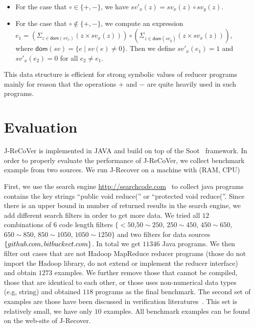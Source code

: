 \documentclass{llncs}
\newcommand{\dom}[1]{\mathsf{dom}(#1)}
\begin{document}
\begin{itemize}
	\item For the case that $\circ \in\{+,-\}$, we have $sv'_x(z) = sv_x(z)\circ  sv_y(z)$. 
	\item For the case that $\circ \notin\{+,-\}$, we compute an expression $e_1= (\Sigma_{z\in \dom{sv_x}} (z\times sv_x(z)) )\circ (\Sigma_{z\in \dom{sv_y}} (z\times sv_x(z)))$, where $\dom{sv}=\{e\mid sv(e)\neq 0\}$. Then we define $sv'_x(e_1) =1$ and $sv'_x(e_2) = 0$ for all $e_2\neq e_1$. 
\end{itemize}

This data structure is efficient for strong symbolic values of reducer programs mainly for reason that the operations $+$ and $-$ are quite heavily used in such programs. 



\section{Evaluation}
\label{section:exp}
J-ReCoVer is implemented in JAVA and build on top of the Soot~\cite{soot} framework. In order to properly evaluate the performance of J-ReCoVer, we collect benchmark example from two sources. We run J-Recover on a machine with (RAM, CPU)

First, we use the search engine \url{http://searchcode.com}~\cite{searchcode} to collect java programs contains the key strings ``public void reduce('' or ``protected void reduce(''.  Since there is an upper bound in number of returned results in the search engine, we add different search filters in order to get more data. We tried all $12$ combinations of $6$ code length filters $\{<50$,$ 50\sim 250$, $250\sim 450$, $450\sim 650$, $650\sim 850$, $850\sim 1050$, $1050\sim 1250\}$ 
and two filters for data sources $\{github.com, bitbuckect.com\}$. In total we get $11346$ Java programs. We then filter out cases that are not Hadoop MapReduce reducer programs (those do not import the Hadoop library, do not extend or implement the reducer interface) and obtain $1273$ examples. We further remove those that cannot be compiled, those that are identical to each other, or those uses non-numerical data types (e.g, string) and obtained $118$ programs as the final benchmark.
The second set of examples are those have been discussed in verification literatures~\cite{ChenHSW15,ChenSW16,SmithA16}. This set is relatively small, we have only $10$ examples. All benchmark examples can be found on the web-site of J-Recover.
\end{document}

